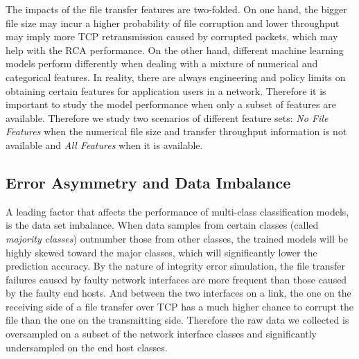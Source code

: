 {The impacts of the file transfer features are two-folded. On one hand, the bigger file size may incur a higher probability of file corruption and lower throughput may imply more TCP retransmission caused by corrupted packets, which may help with the RCA performance. On the other hand, different machine learning models perform differently when dealing with a mixture of numerical and categorical features. In reality, there are always engineering and policy limits on obtaining certain 
features for application users in a network. Therefore it is important to study the model performance when only a subset of features are available. Therefore we study two scenarios of different feature sets: {\it No File Features} when the numerical file size and transfer throughput information is not available and {\it All Features} when it is available.

\subsection{Error Asymmetry and Data Imbalance} 
\label{sub:ml:imbalance}
A leading factor that affects the performance of multi-class classification models, is the data set imbalance. When data samples from certain classes (called {\it majority classes}) outnumber those from other classes, the trained models will be highly skewed toward the major classes, which will significantly lower the prediction accuracy. By the nature of integrity error simulation, the file transfer failures caused by faulty network interfaces are more frequent than those caused by the faulty end hosts. And between the two interfaces on a link, the one on the receiving side of a file transfer over TCP has a much higher chance to corrupt the file than the one on the transmitting side. Therefore the raw data we collected is oversampled on a subset of the network interface classes and significantly undersampled on the end host classes. 

}
